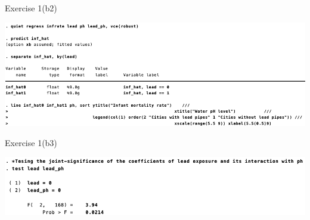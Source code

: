 \documentclass[
  10pt,
  ignorenonframetext,
]{beamer}
\begin{document}
\begin{frame}{Exercise 1(b2)}
\protect\hypertarget{ex1-res3-plotRegLine}{}
\begin{center}\includegraphics[width=1\linewidth]{pictures/ex1-res3-plotRegLine} \end{center}
\end{frame}

\begin{frame}{Exercise 1(b3)}
\protect\hypertarget{ex1-res4-FtestLead}{}
\begin{center}\includegraphics[width=1\linewidth]{pictures/ex1-res4-FtestLead} \end{center}
\end{frame}
\end{document}
